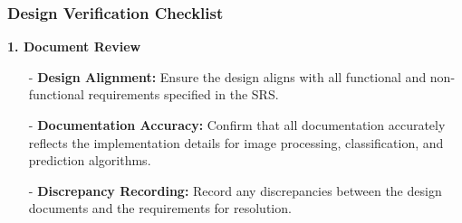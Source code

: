 \documentclass[12pt, titlepage]{article}
\begin{document}
\subsubsection{Design Verification Checklist}

\textbf{1. Document Review}
\begin{itemize}
    \item[-] \textbf{Design Alignment:} Ensure the design aligns with all functional and non-functional requirements specified in the SRS.
    \item[-] \textbf{Documentation Accuracy:} Confirm that all documentation accurately reflects the implementation details for image processing, classification, and prediction algorithms.
    \item[-] \textbf{Discrepancy Recording:} Record any discrepancies between the design documents and the requirements for resolution.
\end{itemize}
\end{document}
